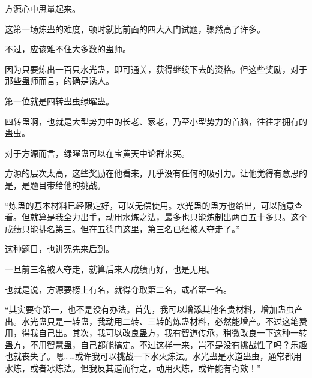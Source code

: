 \begin{this_body}
方源心中思量起来。

这第一场炼蛊的难度，顿时就比前面的四大入门试题，骤然高了许多。

不过，应该难不住大多数的蛊师。

因为只要炼出一百只水光蛊，即可通关，获得继续下去的资格。但这些奖励，对于那些蛊师而言，的确是诱人。

第一位就是四转蛊虫绿曜蛊。

四转蛊啊，也就是大型势力中的长老、家老，乃至小型势力的首脑，往往才拥有的蛊虫。

对于方源而言，绿曜蛊可以在宝黄天中论群来买。

方源的层次太高，这些奖励在他看来，几乎没有任何的吸引力。让他觉得有意思的是，是题目带给他的挑战。

“炼蛊的基本材料已经限定好，可以无偿使用。水光蛊的蛊方也给出，可以随意查看。但就算是我全力出手，动用水炼之法，最多也只能炼制出两百五十多只。这个成绩只能排名第三。但在五德门这里，第三名已经被人夺走了。”

这种题目，也讲究先来后到。

一旦前三名被人夺走，就算后来人成绩再好，也是无用。

也就是说，方源要榜上有名，就得夺取第二名，或者第一名。

“其实要夺第一，也不是没有办法。首先，我可以增添其他名贵材料，增加蛊虫产出。水光蛊只是一转蛊，我动用二转、三转的炼蛊材料，必然能增产。不过这笔费用，得我自己出。其次，我可以改良蛊方，我有智道传承，稍微改良一下这种一转蛊方，不用智慧蛊，自己都能搞定。不过这样一来，岂不是没有挑战性了吗？乐趣也就丧失了。嗯……或许我可以挑战一下水火炼法。水光蛊是水道蛊虫，通常都用水炼，或者冰炼法。但我反其道而行之，动用火炼，或许能有奇效！”

\end{this_body}

